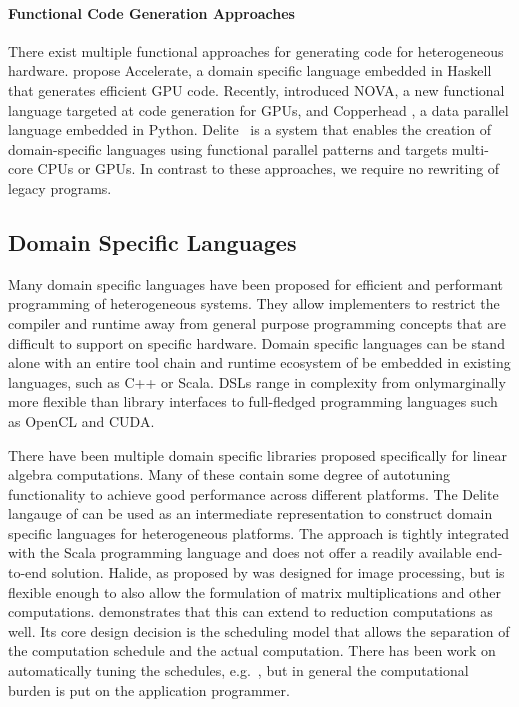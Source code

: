 \paragraph*{Functional Code Generation Approaches}
    There exist multiple functional approaches for generating code for
    heterogeneous hardware.
    \citet{chakravarty11accelerating,mcdonell13optimising} propose Accelerate,
    a domain specific language embedded in Haskell that generates efficient GPU
    code.
    Recently, \citet{collins14nova} introduced NOVA, a new functional language
    targeted at code generation for GPUs, and Copperhead
    \cite{catanzaro11copperhead}, a data parallel language embedded in Python.
    Delite~\cite{brown11heterogeneous,chafi11domain} is a system that enables
    the creation of domain-specific languages using functional parallel patterns
    and targets multi-core CPUs or GPUs.
    In contrast to these approaches, we require no rewriting of legacy programs.

\subsection{Domain Specific Languages}

    Many domain specific languages have been proposed for efficient and
    performant programming of heterogeneous systems.
    They allow implementers to restrict the compiler and runtime away from
    general purpose programming concepts that are difficult to support on
    specific hardware.
    Domain specific languages can be stand alone with an entire tool chain and
    runtime ecosystem of be embedded in existing languages, such as C++ or
    Scala.
    DSLs range in complexity from onlymarginally more flexible than library
    interfaces to full-fledged programming languages such as OpenCL and CUDA.

    There have been multiple domain specific libraries proposed specifically
    for linear algebra computations.
    Many of these contain some degree of autotuning functionality to achieve
    good performance across different platforms.
    The Delite langauge of \citet{Sujeeth:2014:DCA:2601432.2584665} can be used
    as an intermediate representation to construct domain specific languages for
    heterogeneous platforms.
    The approach is tightly integrated with the Scala programming language
    and does not offer a readily available end-to-end solution.
    Halide, as proposed by \citet{Ragan-Kelley:2013:HLC:2499370.2462176}
    was designed for image processing, but is flexible enough to also allow the 
    formulation of matrix multiplications and other computations.
    \citet{Suriana:2017:PAR:3049832.3049863} demonstrates that this can extend
    to reduction computations as well.
    Its core design decision is the scheduling model that allows the separation
    of the computation schedule and the actual computation.
    There has been work on automatically tuning the schedules, e.g.\ 
    \citet{Mullapudi:2016:ASH:2897824.2925952}, but in general the computational
    burden is put on the application programmer.

